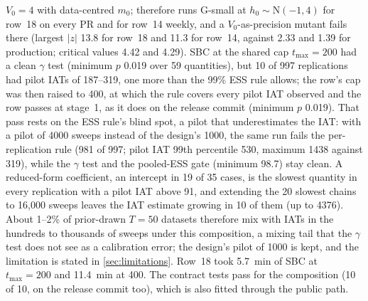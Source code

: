 $V_0 = 4$ with data-centred $m_0$;  therefore runs G-small at
$h_0 \sim \mathrm{N}(-1, 4)$ for row~18 on every PR and for row~14 weekly, and a $V_0$-as-precision
mutant fails there (largest $|z|$ 13.8 for row~18 and 11.3 for row~14, against 2.33 and 1.39 for
production; critical values 4.42 and 4.29). %
SBC at the shared cap $t_{\max} = 200$ had a clean $\gamma$ test (minimum $p$ 0.019 over 59
quantities), but 10 of 997 replications had pilot IATs of 187--319, one more than the 99\% ESS rule
allows; the row's cap was then raised to 400, at which the rule covers every pilot IAT observed and
the row passes at stage~1, as it does on the release commit (minimum $p$ 0.019). %
That pass rests on the ESS rule's blind spot, a pilot that underestimates the IAT: with a pilot of
4000 sweeps instead of the design's 1000, the same run fails the per-replication rule (981 of 997;
pilot IAT 99th percentile 530, maximum 1438 against 319), while the $\gamma$ test and the pooled-ESS
gate (minimum 98.7) stay clean. %
A reduced-form coefficient, an intercept in 19 of 35 cases, is the slowest quantity in every
replication with a pilot IAT above 91, and extending the 20 slowest chains to 16{,}000 sweeps leaves
the IAT estimate growing in 10 of them (up to 4376). About 1--2\% of prior-drawn $T = 50$ datasets
therefore mix with IATs in the hundreds to thousands of sweeps under this composition, a mixing
tail that the $\gamma$ test does not see as a calibration error; the design's pilot of 1000 is
kept, and the limitation is stated in \cref{sec:limitations}. %
Row~18 took 5.7~min of SBC at $t_{\max} = 200$ and 11.4~min at 400. %
The contract tests pass for the composition (10 of 10, on the release commit too), which is also
fitted through the public  path. %

